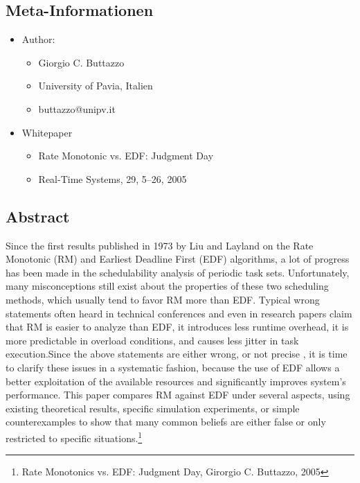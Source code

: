 \subsection{Meta-Informationen}
\begin{frame}{\subsecname}
	\begin{itemize}
		\item Author:
		\begin{itemize}
			\item Giorgio C. Buttazzo
			\item University of Pavia, Italien
			\item buttazzo@unipv.it
		\end{itemize}
		\item Whitepaper
		\begin{itemize}
			\item Rate Monotonic vs. EDF: Judgment Day
			\item Real-Time Systems, 29, 5–26, 2005
		\end{itemize}						
		
	\end{itemize}
\end{frame} 

\subsection{Abstract}
\begin{frame}{\subsecname}
\tiny Since the first results published in 1973 by Liu and Layland on the Rate Monotonic (RM) and Earliest Deadline First (EDF) algorithms, a lot of progress has been made in the schedulability analysis of periodic task sets. Unfortunately, many misconceptions still exist about the properties of these two scheduling methods, which usually tend to favor RM more than EDF. Typical wrong statements often heard in technical conferences and even in research papers claim that RM is easier to analyze than EDF, it introduces less runtime overhead, it is more predictable in overload conditions, and causes less jitter in task execution.Since the above statements are either wrong, or not precise \tiny, it is time to clarify these issues in a systematic fashion, because the use of EDF allows a better exploitation of the available resources and significantly improves system’s performance. This paper compares RM against EDF under several aspects, using existing theoretical results, specific simulation experiments, or simple counterexamples to show that many common beliefs are either false or only restricted to specific situations.\footnote{Rate Monotonics vs. EDF: Judgment Day, Girorgio C. Buttazzo, 2005}
\end{frame}

